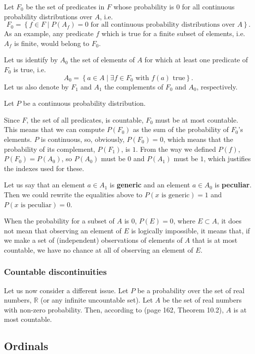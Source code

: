 \documentclass[a4paper
,draft
]{article}
\def\reale{\mathbb{R}}
\newcommand{\multime}[1]{\left\{ #1 \right\}}
\newcommand{\definitie}[1]{\textbf{#1}}
\begin{document}
Let $F_0$ be the set of predicates in $F$ whose probability is
$0$ for all continuous probability distributions over $A$, i.e.
$$F_0=\multime{
  f\in F
  \mid P(A_f)=0
    \mbox{ for all continuous probability distributions over } A}.
$$
As an example, any predicate $f$ which is true for a finite subset of elements,
i.e. $A_f$ is finite, would belong to $F_0$.

Let us identify by $A_0$ the
set of elements of $A$ for which at least one predicate of $F_0$ is true, i.e.
$$A_0=\multime{a \in A\mid \exists f\in F_0 \mbox{ with } f(a)\mbox{ true} }.$$
Let us also denote by $F_1$ and $A_1$ the complements of $F_0$ and $A_0$,
respectively.

Let $P$ be a continuous probability distribution.

Since $F$, the set of all predicates, is countable, $F_0$ must be at most
countable.
This means that we can compute
$P(F_0)$ as the sum of the probability of $F_0$'s elements.
$P$ is continuous, so, obviously, $P(F_0)=0$,
which means that the probability of its complement, $P(F_1)$, is $1$.
From the way we defined $P(f)$, $P(F_0) = P(A_0)$, so $P(A_0)$ must be $0$
and $P(A_1)$ must be $1$, which justifies the indexes used for
these.

Let us say that an element $a\in A_1$ is \definitie{generic}
and an element $a\in A_0$ is \definitie{peculiar}. Then we could rewrite
the equalities above to $P(x\mbox{ is generic}) = 1$ and
$P(x\mbox{ is peculiar}) = 0$.

When the probability for a subset of $A$ is $0$, $P(E)=0$, where $E\subset A$,
it does not mean that observing an element of $E$ is logically impossible,
it means that,
if we make a set of (independent) observations of elements of $A$
that is at most countable, we have no chance at all of observing an element of
$E$.

\subsubsection{Countable discontinuities}

Let us now consider a different issue.
Let $P$ be a probability over the set of real numbers, $\reale$ (or
any infinite uncountable set).
Let $A$ be the set of real numbers with non-zero probability.
Then, according to \textcite{Billingsley1995} (page 162, Theorem 10.2),
$A$ is at most countable.

\subsection{Ordinals}
\label{sec:ordinals}
\end{document}
